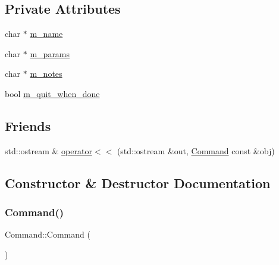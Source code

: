 \subsection*{Private Attributes}
\begin{DoxyCompactItemize}
\item 
char $\ast$ \hyperlink{classCommand_a381973cd5a4b999975c0f79e14245821}{m\+\_\+name}
\item 
char $\ast$ \hyperlink{classCommand_ab80277cb25e2e56e59d342d3499fc55a}{m\+\_\+params}
\item 
char $\ast$ \hyperlink{classCommand_a1c278c3a3b397e387cb831cd1a93e3a9}{m\+\_\+notes}
\item 
bool \hyperlink{classCommand_aa1eb67a0888560ab21c503e1f9ffaad4}{m\+\_\+quit\+\_\+when\+\_\+done}
\end{DoxyCompactItemize}
\subsection*{Friends}
\begin{DoxyCompactItemize}
\item 
std\+::ostream \& \hyperlink{classCommand_a0a193e228644a3735c309d8b2b5b9899}{operator$<$$<$} (std\+::ostream \&out, \hyperlink{classCommand}{Command} const \&obj)
\end{DoxyCompactItemize}


\subsection{Constructor \& Destructor Documentation}
\mbox{\label{classCommand_a18df2d81039392daeb0b78c346a70537}} 
\subsubsection{\texorpdfstring{Command()}{Command()}\hspace{0.1cm}{\footnotesize\ttfamily [1/3]}}
{\footnotesize\ttfamily Command\+::\+Command (\begin{DoxyParamCaption}{ }\end{DoxyParamCaption})}

\mbox{\label{classCommand_ac26b14828c5a72f9bd370421a4788b5d}} 
